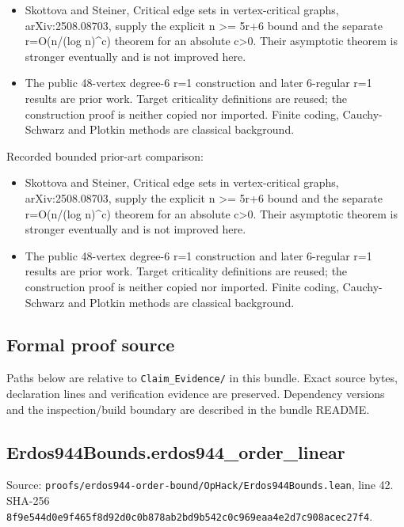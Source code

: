 \documentclass[11pt,a4paper]{article}
\begin{document}
\begin{itemize}
\item Skottova and Steiner, Critical edge sets in vertex-critical graphs, arXiv:2508.08703, supply the explicit n >= 5r+6 bound and the separate r=O(n/(log n)\textasciicircum{}c) theorem for an absolute c>0. Their asymptotic theorem is stronger eventually and is not improved here.
\end{itemize}
\begin{itemize}
\item The public 48-vertex degree-6 r=1 construction and later 6-regular r=1 results are prior work. Target criticality definitions are reused; the construction proof is neither copied nor imported. Finite coding, Cauchy-Schwarz and Plotkin methods are classical background.
\end{itemize}
Recorded bounded prior-art comparison:

\begin{itemize}
\item Skottova and Steiner, Critical edge sets in vertex-critical graphs, arXiv:2508.08703, supply the explicit n >= 5r+6 bound and the separate r=O(n/(log n)\textasciicircum{}c) theorem for an absolute c>0. Their asymptotic theorem is stronger eventually and is not improved here.
\end{itemize}
\begin{itemize}
\item The public 48-vertex degree-6 r=1 construction and later 6-regular r=1 results are prior work. Target criticality definitions are reused; the construction proof is neither copied nor imported. Finite coding, Cauchy-Schwarz and Plotkin methods are classical background.
\end{itemize}
\subsection{Formal proof source}
Paths below are relative to \texttt{Claim\_Evidence/} in this bundle. Exact source bytes, declaration lines and verification evidence are preserved. Dependency versions and the inspection/build boundary are described in the bundle README.

\subsection{Erdos944Bounds.erdos944\_order\_linear}
Source: \texttt{proofs/erdos944-order-bound/OpHack/Erdos944Bounds.lean}, line 42. SHA-256 \texttt{8f9e544d0e9f465f8d92d0c0b878ab2bd9b542c0c969eaa4e2d7c908acec27f4}.
\end{document}
